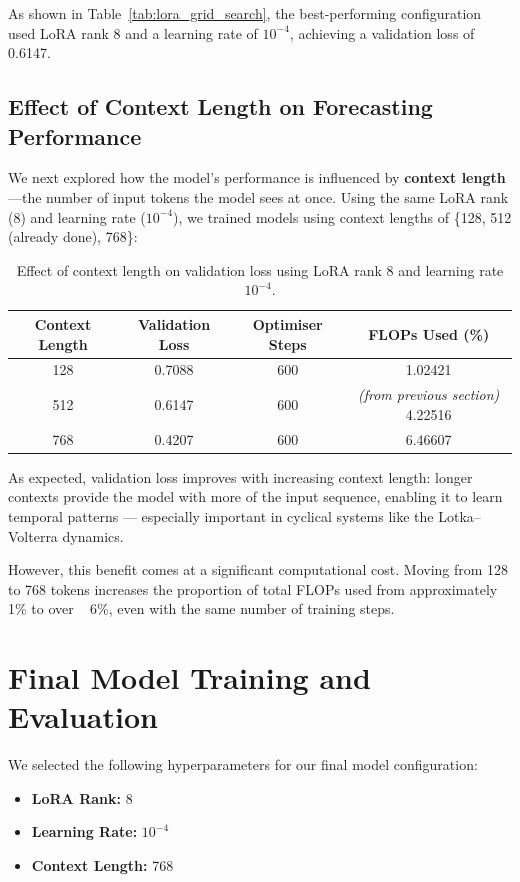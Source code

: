 \documentclass[a4paper,12pt]{article}
\begin{document}
As shown in Table~\ref{tab:lora_grid_search}, the best-performing configuration used LoRA rank 8 and a learning rate of $10^{-4}$, achieving a validation loss of 0.6147.

\subsection*{Effect of Context Length on Forecasting Performance}

We next explored how the model’s performance is influenced by \textbf{context length}—the number of input tokens the model sees at once. Using the same LoRA rank (8) and learning rate ($10^{-4}$), we trained models using context lengths of \{128, 512 (already done), 768\}:

\begin{table}[H]
  \centering
  \begin{tabular}{|c|c|c|c|}
    \hline
    \textbf{Context Length} & \textbf{Validation Loss} & \textbf{Optimiser Steps} & \textbf{FLOPs Used (\%)} \\
    \hline
    128 & 0.7088 & 600 & 1.02421 \\
    512 & 0.6147 & 600 & \textit{(from previous section)} 4.22516 \\
    768 & 0.4207 & 600 & 6.46607 \\
    \hline
  \end{tabular}
  \vspace{0.2cm}
  \caption{Effect of context length on validation loss using LoRA rank 8 and learning rate $10^{-4}$.}
  \label{tab:context_length_results}
\end{table}

As expected, validation loss improves with increasing context length: longer contexts provide the model with more of the input sequence, enabling it to learn temporal patterns — especially important in cyclical systems like the Lotka–Volterra dynamics.

However, this benefit comes at a significant computational cost. Moving from 128 to 768 tokens increases the proportion of total FLOPs used from approximately 1\% to over ~ 6\%, even with the same number of training steps.

\section{Final Model Training and Evaluation}

We selected the following hyperparameters for our final model configuration:
\begin{itemize}
    \item \textbf{LoRA Rank:} 8
    \item \textbf{Learning Rate:} $10^{-4}$
    \item \textbf{Context Length:} 768
\end{itemize}
\end{document}

